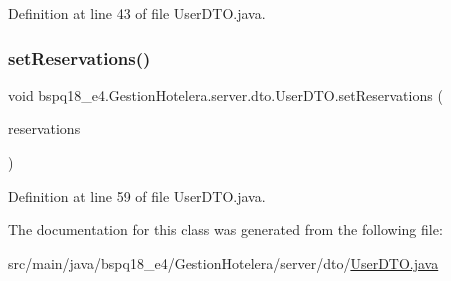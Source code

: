 Definition at line 43 of file User\+D\+T\+O.\+java.

\mbox{\label{classbspq18__e4_1_1_gestion_hotelera_1_1server_1_1dto_1_1_user_d_t_o_aa7bcd9ee107fc328a0aa79c9819e5230}} 
\subsubsection{\texorpdfstring{set\+Reservations()}{setReservations()}}
{\footnotesize\ttfamily void bspq18\+\_\+e4.\+Gestion\+Hotelera.\+server.\+dto.\+User\+D\+T\+O.\+set\+Reservations (\begin{DoxyParamCaption}\item[{Array\+List$<$ \mbox{\hyperlink{classbspq18__e4_1_1_gestion_hotelera_1_1server_1_1dto_1_1_reservation_d_t_o}{Reservation\+D\+TO}} $>$}]{reservations }\end{DoxyParamCaption})}



Definition at line 59 of file User\+D\+T\+O.\+java.



The documentation for this class was generated from the following file\+:\begin{DoxyCompactItemize}
\item 
src/main/java/bspq18\+\_\+e4/\+Gestion\+Hotelera/server/dto/\mbox{\hyperlink{_user_d_t_o_8java}{User\+D\+T\+O.\+java}}\end{DoxyCompactItemize}
